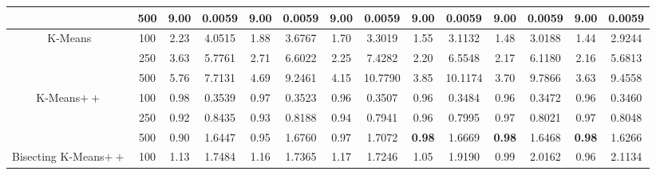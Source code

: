 \documentclass[preprint,12pt]{elsarticle}
\begin{document}
\begin{table}[!t]
{\begin{tabular}{cc|cccccccccccc}
                                       & 500    & 9.00          & 0.0059                    & 9.00          & 0.0059                    & 9.00          & 0.0059                    & 9.00          & 0.0059                    & 9.00          & 0.0059                    & 9.00          & 0.0059          \\ \hline
\multirow{3}{*}{K-Means}               & 100    & 2.23          & 4.0515                    & 1.88          & 3.6767                    & 1.70          & 3.3019                    & 1.55          & 3.1132                    & 1.48          & 3.0188                    & 1.44          & 2.9244          \\
                                       & 250    & 3.63          & 5.7761                    & 2.71          & 6.6022                    & 2.25          & 7.4282                    & 2.20          & 6.5548                    & 2.17          & 6.1180                    & 2.16          & 5.6813          \\
                                       & 500    & 5.76          & 7.7131                    & 4.69          & 9.2461                    & 4.15          & 10.7790                   & 3.85          & 10.1174                   & 3.70          & 9.7866                    & 3.63          & 9.4558          \\ \hline
\multirow{3}{*}{K-Means$++$}           & 100    & 0.98          & 0.3539                    & 0.97          & 0.3523                    & 0.96          & 0.3507                    & 0.96          & 0.3484                    & 0.96          & 0.3472                    & 0.96          & 0.3460          \\
                                       & 250    & 0.92          & 0.8435                    & 0.93          & 0.8188                    & 0.94          & 0.7941                    & 0.96          & 0.7995                    & 0.97          & 0.8021                    & 0.97          & 0.8048          \\
                                       & 500    & 0.90          & 1.6447                    & 0.95          & 1.6760                    & 0.97          & 1.7072                    & \textbf{0.98} & 1.6669                    & \textbf{0.98} & 1.6468                    & \textbf{0.98} & 1.6266          \\ \hline
\multirow{3}{*}{Bisecting K-Means$++$} & 100    & 1.13          & 1.7484                    & 1.16          & 1.7365                    & 1.17          & 1.7246                    & 1.05          & 1.9190                    & 0.99          & 2.0162                    & 0.96          & 2.1134          \\

\end{tabular}}
\end{table}
\end{document}
